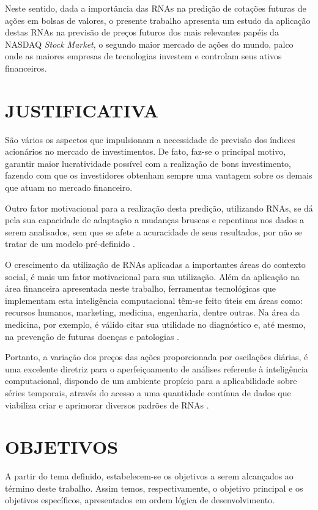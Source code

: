 Neste sentido, dada a importância das RNAs na predição de cotações futuras de ações em bolsas de valores, o presente trabalho apresenta um estudo da aplicação destas RNAs na previsão de preços futuros dos mais relevantes papéis da NASDAQ \textit{Stock Market}, o segundo maior mercado de ações do mundo, palco onde as maiores empresas de tecnologias investem e controlam seus ativos financeiros.


\section{JUSTIFICATIVA}\label{sec:justificativa}

São vários os aspectos que impulsionam a necessidade de previsão dos índices acionários no mercado de investimentos. De fato, faz-se o principal motivo, garantir maior lucratividade possível com a realização de bons investimento, fazendo com que os investidores obtenham sempre uma vantagem sobre os demais que atuam no mercado financeiro.

Outro fator motivacional para a realização desta predição, utilizando RNAs, se dá pela sua capacidade de adaptação a mudanças bruscas e repentinas nos dados a serem analisados, sem que se afete a acuracidade de seus resultados, por não se tratar de um modelo pré-definido \cite{marangoni}.

O crescimento da utilização de RNAs aplicadas a importantes áreas do contexto social, é mais um fator motivacional para sua utilização. Além da aplicação na área financeira apresentada neste trabalho, ferramentas tecnológicas que implementam esta inteligência computacional têm-se feito úteis em áreas como: recursos humanos, marketing, medicina, engenharia, dentre outras. Na área da medicina, por exemplo, é válido citar sua utilidade no diagnóstico e, até mesmo, na prevenção de futuras doenças e patologias \cite{marangoni}.

Portanto, a variação dos preços das ações proporcionada por oscilações diárias, é uma excelente diretriz para o aperfeiçoamento de análises referente à inteligência computacional, dispondo de um ambiente propício para a aplicabilidade sobre séries temporais, através do acesso a uma quantidade contínua de dados que viabiliza criar e aprimorar diversos padrões de RNAs \cite{gambogi}.



\section{OBJETIVOS}\label{sec:objetivos}
A partir do tema definido, estabelecem-se os objetivos a serem alcançados ao término deste trabalho. Assim temos, respectivamente, o objetivo principal e os objetivos específicos, apresentados em ordem lógica de desenvolvimento.
